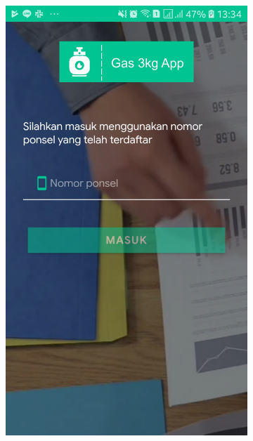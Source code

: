 	\vspace{-0.2cm}
	\begin{figure}[H]
		\centering
		\begin{subfigure}[b]{0.4\linewidth}
				\includegraphics [width = \linewidth]{gambar/android/login}
		\end{subfigure}
		\begin{subfigure}[b]{0.4\linewidth}

\end{subfigure}
\end{figure}
